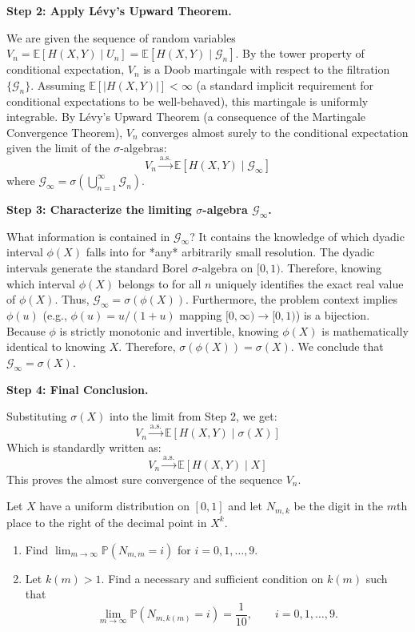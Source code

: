 \begin{solution}
\textbf{Step 2: Apply Lévy's Upward Theorem.}

We are given the sequence of random variables $V_n = \mathbb{E}[H(X,Y) \mid U_n] = \mathbb{E}[H(X,Y) \mid \mathcal{G}_n]$.
By the tower property of conditional expectation, $V_n$ is a Doob martingale with respect to the filtration $\{\mathcal{G}_n\}$.
Assuming $\mathbb{E}[|H(X,Y)|] < \infty$ (a standard implicit requirement for conditional expectations to be well-behaved), this martingale is uniformly integrable.
By Lévy's Upward Theorem (a consequence of the Martingale Convergence Theorem), $V_n$ converges almost surely to the conditional expectation given the limit of the $\sigma$-algebras:
\[ V_n \xrightarrow{\text{a.s.}} \mathbb{E}[H(X,Y) \mid \mathcal{G}_\infty] \]
where $\mathcal{G}_\infty = \sigma\left(\bigcup_{n=1}^\infty \mathcal{G}_n \right)$.

\textbf{Step 3: Characterize the limiting $\sigma$-algebra $\mathcal{G}_\infty$.}

What information is contained in $\mathcal{G}_\infty$? It contains the knowledge of which dyadic interval $\phi(X)$ falls into for *any* arbitrarily small resolution.
The dyadic intervals generate the standard Borel $\sigma$-algebra on $[0, 1)$. Therefore, knowing which interval $\phi(X)$ belongs to for all $n$ uniquely identifies the exact real value of $\phi(X)$. Thus, $\mathcal{G}_\infty = \sigma(\phi(X))$.
Furthermore, the problem context implies $\phi(u)$ (e.g., $\phi(u) = u/(1+u)$ mapping $[0, \infty) \to [0, 1)$) is a bijection. Because $\phi$ is strictly monotonic and invertible, knowing $\phi(X)$ is mathematically identical to knowing $X$.
Therefore, $\sigma(\phi(X)) = \sigma(X)$.
We conclude that $\mathcal{G}_\infty = \sigma(X)$.

\textbf{Step 4: Final Conclusion.}

Substituting $\sigma(X)$ into the limit from Step 2, we get:
\[ V_n \xrightarrow{\text{a.s.}} \mathbb{E}[H(X,Y) \mid \sigma(X)] \]
Which is standardly written as:
\[ V_n \xrightarrow{\text{a.s.}} \mathbb{E}[H(X,Y) \mid X] \]
This proves the almost sure convergence of the sequence $V_n$.
\end{solution}

\begin{exercise}\label{probability:2024:3}
Let $X$ have a uniform distribution on $[0,1]$ and let $N_{m,k}$ be the digit in the $m$th place to the right of the decimal point in $X^k$.
\begin{enumerate}
    \item[(a)] Find $\lim_{m\to\infty}\mathbb{P}(N_{m,m}=i)$ for $i=0,1,\ldots,9$.
    \item[(b)] Let $k(m)>1$. Find a necessary and sufficient condition on $k(m)$ such that
    \[
    \lim_{m\to\infty}\mathbb{P}(N_{m,k(m)}=i)=\frac{1}{10},
    \qquad i=0,1,\ldots,9.
    \]
\end{enumerate}
\end{exercise}


